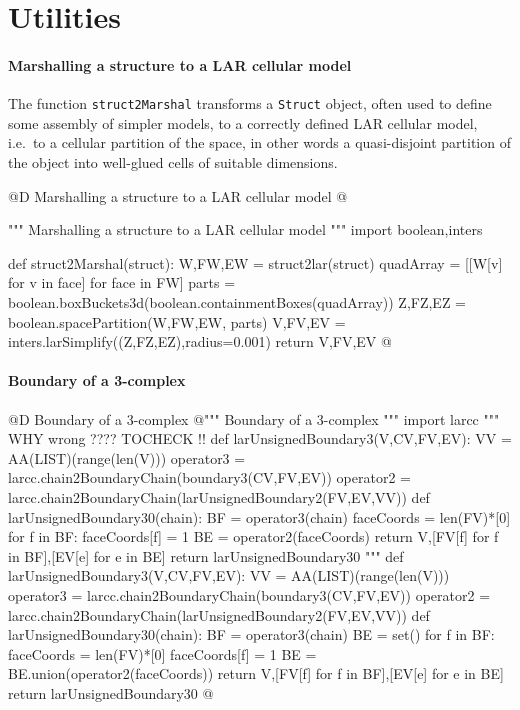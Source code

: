 \documentclass[11pt,oneside]{article}    %
\begin{document}
\appendix
\section{Utilities}


\paragraph{Marshalling a structure to a LAR cellular model}
The function \texttt{struct2Marshal} transforms a \texttt{Struct} object, often used to 
define some assembly of simpler models, to a correctly defined LAR cellular model, i.e.~to
a cellular partition of the space, in other words a quasi-disjoint partition of the object into well-glued cells of suitable dimensions.

@D Marshalling a structure to a LAR cellular model
@{""" Marshalling a structure to a LAR cellular model """
import boolean,inters

def struct2Marshal(struct):
    W,FW,EW = struct2lar(struct)
    quadArray = [[W[v] for v in face] for face in FW]
    parts = boolean.boxBuckets3d(boolean.containmentBoxes(quadArray))
    Z,FZ,EZ = boolean.spacePartition(W,FW,EW, parts)
    V,FV,EV = inters.larSimplify((Z,FZ,EZ),radius=0.001)
    return V,FV,EV
@}

\paragraph{Boundary of a 3-complex}
@D Boundary of a 3-complex
@{""" Boundary of a 3-complex """
import larcc
"""  WHY wrong ????  TOCHECK !!
def larUnsignedBoundary3(V,CV,FV,EV):
    VV = AA(LIST)(range(len(V)))
    operator3 = larcc.chain2BoundaryChain(boundary3(CV,FV,EV))
    operator2 = larcc.chain2BoundaryChain(larUnsignedBoundary2(FV,EV,VV))
    def larUnsignedBoundary30(chain):
        BF = operator3(chain)
        faceCoords = len(FV)*[0]
        for f in BF: faceCoords[f] = 1
        BE = operator2(faceCoords)
        return V,[FV[f] for f in BF],[EV[e] for e in BE]
    return larUnsignedBoundary30
"""
def larUnsignedBoundary3(V,CV,FV,EV):
    VV = AA(LIST)(range(len(V)))
    operator3 = larcc.chain2BoundaryChain(boundary3(CV,FV,EV))
    operator2 = larcc.chain2BoundaryChain(larUnsignedBoundary2(FV,EV,VV))
    def larUnsignedBoundary30(chain):
        BF = operator3(chain)
        BE = set()
        for f in BF: 
            faceCoords = len(FV)*[0]
            faceCoords[f] = 1
            BE = BE.union(operator2(faceCoords))
        return V,[FV[f] for f in BF],[EV[e] for e in BE]
    return larUnsignedBoundary30
@}
\end{document}

